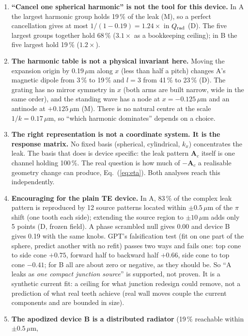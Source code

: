 \documentclass[11pt,a4paper]{article}
\begin{document}
\begin{enumerate}
\item \textbf{``Cancel one spherical harmonic'' is not the tool for this device.} In A the largest harmonic
group holds 19\,\% of the leak (M), so a perfect cancellation gives at most $1/(1-0.19)=1.24\times$ in
$Q_{\rm rad}$ (D). The five largest groups together hold 68\,\% ($3.1\times$ as a bookkeeping ceiling); in B
the five largest hold 19\,\% ($1.2\times$).
\item \textbf{The harmonic table is not a physical invariant here.} Moving the expansion origin by
0.19\,$\mu$m along $x$ (less than half a pitch) changes A's magnetic dipole from 3\,\% to 19\,\% and $l=3$ from
41\,\% to 23\,\% (D). The grating has no mirror symmetry in $x$ (both arms are built narrow, wide in the
same order), and the standing wave has a node at $x=-0.125$\,$\mu$m and an antinode at $+0.125$\,$\mu$m (M).
There is no natural centre at the scale $1/k=0.17$\,$\mu$m, so ``which harmonic dominates'' depends on a choice.
\item \textbf{The right representation is not a coordinate system. It is the response matrix.} No fixed basis
(spherical, cylindrical, $k_x$) concentrates the leak. The basis that does is device specific: the leak pattern
$\mathbf A_c$ itself is one channel holding 100\,\%. The real question is how much of $-\mathbf A_c$ a
realisable geometry change can produce, Eq.~(\ref{eq:eta}). Both analyses reach this independently.
\item \textbf{Encouraging for the plain TE device.} In A, 83\,\% of the complex leak pattern is reproduced by
12 source patterns located within $\pm0.5$\,$\mu$m of the $\pi$ shift (one tooth each side); extending
the source region to $\pm10$\,$\mu$m adds only 5 points (D, frozen field). A phase scrambled null gives 0.00
and device B gives 0.19 with the same knobs. GPT's falsification test (fit on one part of the sphere, predict
another with no refit) passes two ways and fails one: top cone to side cone $+0.75$, forward half to backward
half $+0.66$, side cone to top cone $-0.41$; for B all are about zero or negative, as they should be. So
``A leaks as \emph{one compact junction source}'' is supported, not proven. It is a synthetic current fit: a ceiling for what junction redesign could remove, not a
prediction of what real teeth achieve (real wall moves couple the current components and are bounded in size).
\item \textbf{The apodized device B is a distributed radiator} (19\,\% reachable within $\pm0.5$\,$\mu$m,

\end{enumerate}
\end{document}
